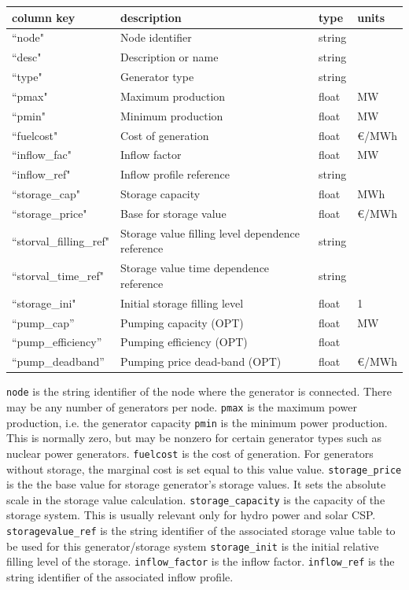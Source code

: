 \documentclass{article}
\begin{document}
\medskip
\begin{tabular}{llll}
	\hline
	 column key & description & type & units \\
	\hline
	``node"			& Node identifier 		& string	& \\
	``desc"			& Description or name	& string	& \\
	``type"			& Generator type		& string	& \\
	``pmax"			& Maximum production 	& float	& MW \\
	``pmin"			& Minimum production	& float	& MW \\
	``fuelcost"		& Cost of generation		& float	& €/MWh \\
	``inflow\_fac"	& Inflow factor			& float	& MW \\
	``inflow\_ref"		& Inflow profile reference	& string & \\
	``storage\_cap"	& Storage capacity		& float	& MWh \\
	``storage\_price"			& Base for storage value	& float	& €/MWh \\
	``storval\_filling\_ref"	& Storage value filling level dependence reference	& string & \\
	``storval\_time\_ref"	& Storage value time dependence reference	& string & \\
	``storage\_ini"		& Initial storage filling level	& float	& 1 \\
	``pump\_cap''		& Pumping capacity (OPT)	& float		& MW \\
	``pump\_efficiency''	& Pumping efficiency (OPT) & float	& \\
	``pump\_deadband''	& Pumping price dead-band (OPT)  & float & €/MWh \\
	\hline
\end{tabular}

\bigskip\noindent
\texttt{node} is the string identifier of the node where the generator is connected. There may be any number of generators per node.
\texttt{pmax} is the maximum power production, i.e. the generator capacity
\texttt{pmin} is the minimum power production. This is normally zero, but may be nonzero for certain generator types such as nuclear power generators.
\texttt{fuelcost} is the cost of generation. For generators without storage, the marginal cost is set equal to this value value.
\texttt{storage\_price} is the the base value for storage generator's storage values. It sets the absolute scale in the storage value calculation.
\texttt{storage\_capacity} is the capacity of the storage system. This is usually relevant only for hydro power and solar CSP.
\texttt{storagevalue\_ref} is the string identifier of the associated storage value table to be used for this generator/storage system
\texttt{storage\_init} is the initial relative filling level of the storage.
\texttt{inflow\_factor} is the inflow factor.
\texttt{inflow\_ref} is the string identifier of the associated inflow profile.
\end{document}
